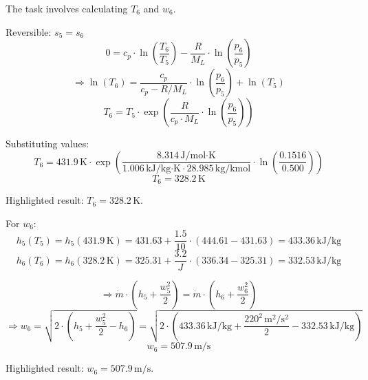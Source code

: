 The task involves calculating \( T_6 \) and \( w_6 \).  

Reversible: \( s_5 = s_6 \)  
\[
0 = c_p \cdot \ln\left(\frac{T_6}{T_5}\right) - \frac{R}{M_L} \cdot \ln\left(\frac{p_6}{p_5}\right)
\]  
\[
\Rightarrow \ln(T_6) = \frac{c_p}{c_p - R/M_L} \cdot \ln\left(\frac{p_6}{p_5}\right) + \ln(T_5)
\]  
\[
T_6 = T_5 \cdot \exp\left(\frac{R}{c_p \cdot M_L} \cdot \ln\left(\frac{p_6}{p_5}\right)\right)
\]  

Substituting values:  
\[
T_6 = 431.9 \, \text{K} \cdot \exp\left(\frac{8.314 \, \text{J/mol·K}}{1.006 \, \text{kJ/kg·K} \cdot 28.985 \, \text{kg/kmol}} \cdot \ln\left(\frac{0.1516}{0.500}\right)\right)
\]  
\[
T_6 = 328.2 \, \text{K}
\]  

Highlighted result: \( T_6 = 328.2 \, \text{K} \).  

For \( w_6 \):  
\[
h_5(T_5) = h_5(431.9 \, \text{K}) = 431.63 + \frac{1.5}{10} \cdot (444.61 - 431.63) = 433.36 \, \text{kJ/kg}
\]  
\[
h_6(T_6) = h_6(328.2 \, \text{K}) = 325.31 + \frac{3.2}{J} \cdot (336.34 - 325.31) = 332.53 \, \text{kJ/kg}
\]  

\[
\Rightarrow \dot{m} \cdot \left(h_5 + \frac{w_5^2}{2}\right) = \dot{m} \cdot \left(h_6 + \frac{w_6^2}{2}\right)
\]  
\[
\Rightarrow w_6 = \sqrt{2 \cdot \left(h_5 + \frac{w_5^2}{2} - h_6\right)} = \sqrt{2 \cdot \left(433.36 \, \text{kJ/kg} + \frac{220^2 \, \text{m}^2/\text{s}^2}{2} - 332.53 \, \text{kJ/kg}\right)}
\]  
\[
w_6 = 507.9 \, \text{m/s}
\]  

Highlighted result: \( w_6 = 507.9 \, \text{m/s} \).
